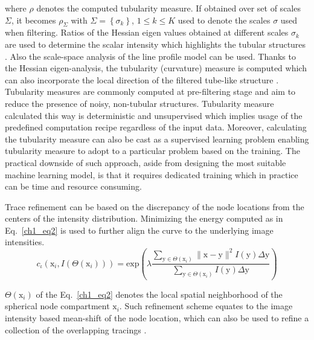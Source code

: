 where $ \rho $ denotes the computed tubularity measure. If obtained over set of scales $\Sigma$, it becomes $\rho_{\Sigma}$ with $\Sigma = \left\lbrace \sigma_k \right\rbrace$, $1 \leq k \leq K$ used to denote the scales $\sigma$ used when filtering. Ratios of the Hessian eigen values obtained at different scales $\sigma_k$ are used to determine the scalar intensity which highlights the tubular structures \cite{sato19973d,meijering2004design,frangi1998multiscale}. Also the scale-space analysis of the line profile model \cite{steger1998unbiased} can be used. Thanks to the Hessian eigen-analysis, the tubularity (curvature) measure is computed \cite{sato19973d} which can also incorporate the local direction of the filtered tube-like structure \cite{frangi1998multiscale,meijering2004design}. Tubularity measures are commonly computed at pre-filtering stage and aim to reduce the presence of noisy, non-tubular structures. Tubularity measure calculated this way is deterministic and unsupervised  which implies usage of the predefined computation recipe regardless of the input data. Moreover, calculating the tubularity measure can also be cast as a supervised learning problem \cite{sironi2016multiscale,li2017deep} enabling tubularity measure to adopt to a particular problem based on the training. The practical downside of such approach, aside from designing the most suitable machine learning model, is that it requires dedicated training which in practice can be time and resource consuming.%

Trace refinement can be based on the discrepancy of the node locations from the centers of the intensity distribution. Minimizing the energy computed as in Eq.~\ref{ch1_eq2} is used to further align the curve to the underlying image intensities.  
\begin{equation}
c_{\iota}(\mathrm{x}_i, I(\Theta(\mathrm{x}_i))) = \text{exp} \left( \lambda \frac{ \sum\nolimits_{\mathrm{y} \in \Theta(\mathrm{x}_i)} \lVert \mathrm{x} - \mathrm{y} \rVert^2 I(\mathrm{y}) \Delta\mathrm{y}  }{\sum\nolimits_{\mathrm{y} \in \Theta(\mathrm{x}_i)} I(\mathrm{y}) \Delta\mathrm{y} } \right) 
\label{ch1_eq2}
\end{equation}

$\Theta(\mathrm{x}_i)$ of the Eq.~\ref{ch1_eq2} denotes the local spatial neighborhood of the spherical node compartment $\mathrm{x}_i$. Such refinement scheme equates to the image intensity based mean-shift \cite{cheng1995mean} of the node location, which can also be used to refine a collection of the overlapping tracings \cite{radojevic-pnr}.

